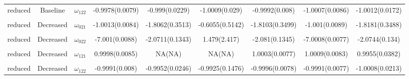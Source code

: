 \documentclass[
]{article}
\begin{document}
\begin{landscape}
\begin{longtable}{ccccccccc}
reduced & Baseline & $\omega_{122}$ & -0.9978(0.0079) & -0.999(0.0229) & -1.0009(0.029) & -0.9992(0.008) & -1.0007(0.0086) & -1.0012(0.0172)\\
\addlinespace
\cellcolor{gray!15}{reduced} & \cellcolor{gray!15}{Decreased} & \cellcolor{gray!15}{$\omega_{011}$} & \cellcolor{gray!15}{-7.9997(0.008)} & \cellcolor{gray!15}{-3.2048(0.0822)} & \cellcolor{gray!15}{0.479(2.417)} & \cellcolor{gray!15}{-3.2145(0.081)} & \cellcolor{gray!15}{-8.0011(0.0082)} & \cellcolor{gray!15}{-3.2093(0.0816)}\\
reduced & Decreased & $\omega_{021}$ & -1.0013(0.0084) & -1.8062(0.3513) & -0.6055(0.5142) & -1.8103(0.3499) & -1.001(0.0089) & -1.8181(0.3488)\\
\cellcolor{gray!15}{reduced} & \cellcolor{gray!15}{Decreased} & \cellcolor{gray!15}{$\omega_{012}$} & \cellcolor{gray!15}{-0.5004(0.0082)} & \cellcolor{gray!15}{-1.5674(0.1783)} & \cellcolor{gray!15}{-0.6053(0.3139)} & \cellcolor{gray!15}{-1.5711(0.1817)} & \cellcolor{gray!15}{-0.5013(0.0079)} & \cellcolor{gray!15}{-1.5762(0.1784)}\\
reduced & Decreased & $\omega_{022}$ & -7.001(0.0088) & -2.0711(0.1343) & 1.479(2.417) & -2.081(0.1345) & -7.0008(0.0077) & -2.0744(0.134)\\
\cellcolor{gray!15}{reduced} & \cellcolor{gray!15}{Decreased} & \cellcolor{gray!15}{$\omega_{111}$} & \cellcolor{gray!15}{-2.9997(0.0082)} & \cellcolor{gray!15}{-2.9964(0.0209)} & \cellcolor{gray!15}{-2.9966(0.1032)} & \cellcolor{gray!15}{-3.0003(0.0074)} & \cellcolor{gray!15}{-3.0016(0.0076)} & \cellcolor{gray!15}{-2.9943(0.0178)}\\
\addlinespace
reduced & Decreased & $\omega_{121}$ & 0.9998(0.0085) & NA(NA) & NA(NA) & 1.0003(0.0077) & 1.0009(0.0083) & 0.9955(0.0382)\\
\cellcolor{gray!15}{reduced} & \cellcolor{gray!15}{Decreased} & \cellcolor{gray!15}{$\omega_{112}$} & \cellcolor{gray!15}{0.9995(0.0082)} & \cellcolor{gray!15}{NA(NA)} & \cellcolor{gray!15}{NA(NA)} & \cellcolor{gray!15}{0.9992(0.0077)} & \cellcolor{gray!15}{1.0008(0.0079)} & \cellcolor{gray!15}{1.0015(0.0225)}\\
reduced & Decreased & $\omega_{122}$ & -0.9991(0.008) & -0.9952(0.0246) & -0.9925(0.1476) & -0.9996(0.0078) & -0.9991(0.0077) & -1.0008(0.0213)\\*
\end{longtable}
\end{landscape}
\end{document}
